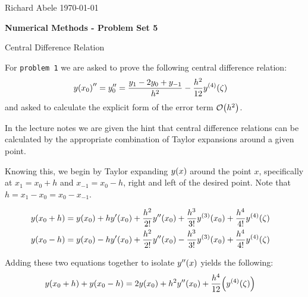 \documentclass[12pt]{article}
\newenvironment{ex}[2][Exercise]{\begin{trivlist}
\item[\hskip \labelsep {\bfseries #1}\hskip \labelsep {\bfseries #2.}]}{\end{trivlist}}
\newenvironment{sol}[1][Solution]{\begin{trivlist}
\item[\hskip \labelsep {\bfseries #1:}]}{\end{trivlist}}
\DeclarePairedDelimiter\rb{(}{)}
\begin{document}
\noindent Richard Abele \hfill \today \\[30pt]
\centerline{ \Large{ \textbf{ Numerical Methods - Problem Set 5 }}}

\begin{ex}
	1 Central Difference Relation
\end{ex}

For \texttt{problem 1} we are asked to prove the following central difference relation: 
\begin{align*}
	y \rb*{ x_{0}} '' & =  y_{0}'' = \frac{y_{1} - 2 y_{0} + y_{-1}}{h^{2}} - \frac{h^{2}}{12} y^{\rb*{4}} \rb*{\zeta} &\\
\end{align*}
and asked to calculate the explicit form of the error term \(\mathcal{O } \rb*{h^{2}}\).

\begin{sol}  \end{sol}


In the lecture notes we are given the hint that central difference relations can be calculated by the appropriate combination of Taylor expansions around a given point. 

Knowing this, we begin by Taylor expanding \(y\rb*{x}\) around the point \(x\), specifically at \(x_{1} = x_{0} + h\) and \(x_{-1} = x_{0} - h\), right and left of the desired point. Note that \(h = x_{1} - x_{0} = x_{0} - x_{-1}\).

\begin{align*}
	y \rb*{ x_{0} + h } & =  y \rb*{ x_{0}} + h y' \rb*{x_{0}} + \frac{h^{2}}{2!} y'' \rb*{x_{0}} + \frac{h^{3}}{3!} y^{\rb*{3}} \rb*{x_{0}} + \frac{h^{4}}{4!} y ^{\rb*{4}} \rb*{\zeta} &\\
	y \rb*{ x_{0} - h} & =  y \rb*{ x_{0}}
	- h y' \rb*{x_{0}}
	+ \frac{h^{2}}{2!} y'' \rb*{x_{0}}
	- \frac{h^{3}}{3!} y^{\rb*{3}} \rb*{x_{0}}
	+ \frac{h^{4}}{4!} y^{\rb*{4}} \rb*{\zeta} &\\
\end{align*}

Adding these two equations together to isolate \(y''\rb*{x}\) yields the following:
\begin{align*}
	y \rb*{x_{0} + h} + y \rb*{x_{0} - h} & = 
	2 y \rb*{x_{0}} + h^{2} y'' \rb*{x_{0}} 
	+ \frac{h^{4}}{12} \rb*{ y^{\rb*{4}} \rb*{\zeta}} &\\
\end{align*}

\end{document}
